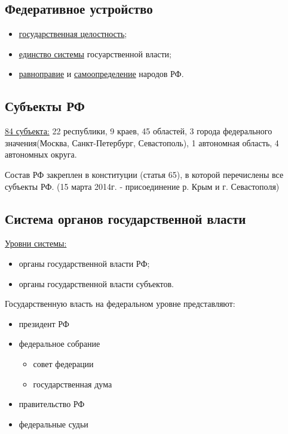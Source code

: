 \documentclass[a5paper,10pt]{article}
\begin{document}
		\subsection{Федеративное устройство}
			\begin{itemize}[itemsep=0pt]
				\item \underline{государственная целостность};
				\item \underline{единство системы} госуарственной власти;
				\item \underline{равноправие} и \underline{самоопределение} народов РФ.
			\end{itemize}

		\subsection{Субъекты РФ}
			\underline{84 субъекта:} 22 республики, 9 краев, 45 областей, 3 города федерального значения(Москва, Санкт-Петербург, Севастополь), 1 автономная область, 4 автономных округа.

			Состав РФ закреплен в конституции (статья 65), в которой перечислены все субъекты РФ.
			(15 марта 2014г. - присоединение р. Крым и г. Севастополя)

		\subsection{Система органов государственной власти}
			\underline{Уровни системы:}
			\begin{itemize}[itemsep=0pt]
				\item органы государственной власти РФ;
				\item органы государственной власти субъектов.
			\end{itemize}

			Государственную власть на федеральном уровне представляют:
			\begin{itemize}[itemsep=0pt]
				\item президент РФ
				\item федеральное собрание
					\begin{itemize}
						\item совет федерации
						\item государственная дума
					\end{itemize}
				\item правительство РФ
				\item федеральные судьи
			\end{itemize}
\end{document}
